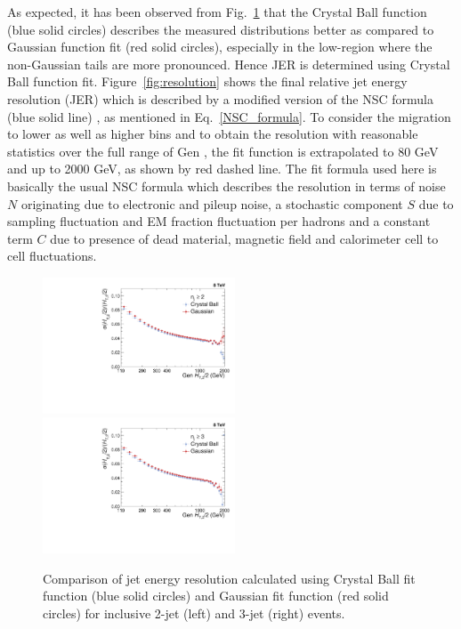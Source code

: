 As expected, it has been observed from Fig.~\ref{fig:res_comp} that the Crystal Ball function (blue solid circles) describes the measured distributions better as compared to Gaussian function fit (red solid circles), especially in the low-\httwo region where the non-Gaussian tails are more pronounced. Hence JER is determined using Crystal Ball function fit. Figure~\ref{fig:resolution} shows the final relative jet energy resolution (JER) which is described by a modified version of the NSC formula (blue solid line) \cite{CMS:2011esa}, as mentioned in Eq.~\ref{NSC_formula}. To consider the migration to lower as well as higher bins and to obtain the resolution with reasonable statistics over the full range of Gen \httwons, the fit function is extrapolated to 80 GeV and up to 2000 GeV, as shown by red dashed line. The fit formula used here is basically the usual NSC formula which describes the resolution in terms of noise $N$ originating due to electronic and pileup noise, a stochastic component $S$ due to sampling fluctuation and EM fraction fluctuation per hadrons and a constant term $C$ due to presence of dead material, magnetic field and calorimeter cell to cell fluctuations. \begin{figure}[!h]
 \begin{center}
 \hspace*{-5mm}\includegraphics[width=0.51\textwidth]{Plots_HT_2_150/Comparison_Resolution_Crystal_Gauss_2.pdf}%
 ~~\includegraphics[width=0.51\textwidth]{Plots_HT_2_150/Comparison_Resolution_Crystal_Gauss_3.pdf}
 \caption[Comparison of jet energy resolution calculated using Crystal Ball fit function and Gaussian fit function]{Comparison of jet energy resolution calculated using Crystal Ball fit function (blue solid circles) and Gaussian fit function (red solid circles) for inclusive 2-jet (left) and 3-jet (right) events.}
 \label{fig:res_comp}
 \end{center}
\end{figure}
